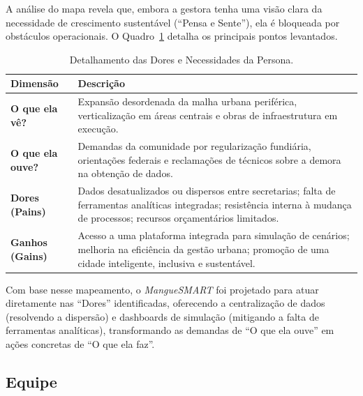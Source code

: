 \documentclass[12pt]{article}
\begin{document}
A análise do mapa revela que, embora a gestora tenha uma visão clara da necessidade de crescimento sustentável (``Pensa e Sente''), ela é bloqueada por obstáculos operacionais. O Quadro~\ref{quadro:empatia} detalha os principais pontos levantados.

\begin{table}[H]
\centering
\caption{Detalhamento das Dores e Necessidades da Persona.}
\label{quadro:empatia}
\begin{tabular}{@{}p{3cm} p{9.5cm}@{}}
\toprule
\textbf{Dimensão} & \textbf{Descrição} \\
\midrule
\textbf{O que ela vê?} & Expansão desordenada da malha urbana periférica, verticalização em áreas centrais e obras de infraestrutura em execução. \\
\midrule
\textbf{O que ela ouve?} & Demandas da comunidade por regularização fundiária, orientações federais e reclamações de técnicos sobre a demora na obtenção de dados. \\
\midrule
\textbf{Dores (Pains)} & Dados desatualizados ou dispersos entre secretarias; falta de ferramentas analíticas integradas; resistência interna à mudança de processos; recursos orçamentários limitados. \\
\midrule
\textbf{Ganhos (Gains)} & Acesso a uma plataforma integrada para simulação de cenários; melhoria na eficiência da gestão urbana; promoção de uma cidade inteligente, inclusiva e sustentável. \\
\bottomrule
\end{tabular}
\end{table}

Com base nesse mapeamento, o \textit{MangueSMART} foi projetado para atuar diretamente nas ``Dores'' identificadas, oferecendo a centralização de dados (resolvendo a dispersão) e dashboards de simulação (mitigando a falta de ferramentas analíticas), transformando as demandas de ``O que ela ouve'' em ações concretas de ``O que ela faz''.


\subsection{Equipe}
\end{document}
